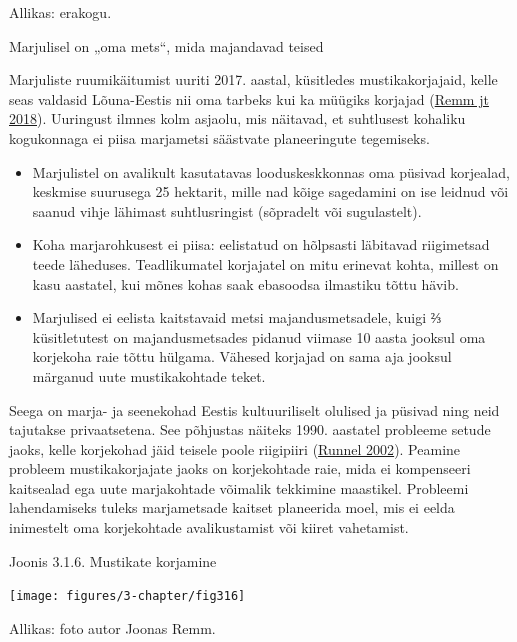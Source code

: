 \documentclass[estonian,]{article}
\providecommand{\tightlist}{%
  \setlength{\itemsep}{0pt}\setlength{\parskip}{0pt}}
\begin{document}
\begin{imgsource}
{Allikas:} erakogu.
\end{imgsource}

Marjulisel on „oma mets``, mida majandavad teised

Marjuliste ruumikäitumist uuriti 2017. aastal, küsitledes mustikakorjajaid, kelle seas valdasid Lõuna-Eestis nii oma tarbeks kui ka müügiks korjajad (\protect\hyperlink{Remm2018}{Remm jt 2018}). Uuringust ilmnes kolm asjaolu, mis näitavad, et suhtlusest kohaliku kogukonnaga ei piisa marjametsi säästvate planeeringute tegemiseks.

\begin{itemize}
\tightlist
\item
  Marjulistel on avalikult kasutatavas looduskeskkonnas oma püsivad korjealad, keskmise suurusega 25 hektarit, mille nad kõige sagedamini on ise leidnud või saanud vihje lähimast suhtlusringist (sõpradelt või sugulastelt).
\item
  Koha marjarohkusest ei piisa: eelistatud on hõlpsasti läbitavad riigimetsad teede läheduses. Teadlikumatel korjajatel on mitu erinevat kohta, millest on kasu aastatel, kui mõnes kohas saak ebasoodsa ilmastiku tõttu hävib.
\item
  Marjulised ei eelista kaitstavaid metsi majandusmetsadele, kuigi ⅔ küsitletutest on majandusmetsades pidanud viimase 10 aasta jooksul oma korjekoha raie tõttu hülgama. Vähesed korjajad on sama aja jooksul märganud uute mustikakohtade teket.
\end{itemize}

Seega on marja- ja seenekohad Eestis kultuuriliselt olulised ja püsivad ning neid tajutakse privaatsetena. See põhjustas näiteks 1990. aastatel probleeme setude jaoks, kelle korjekohad jäid teisele poole riigipiiri (\protect\hyperlink{Runnel2002}{Runnel 2002}). Peamine probleem mustikakorjajate jaoks on korjekohtade raie, mida ei kompenseeri kaitsealad ega uute marjakohtade võimalik tekkimine maastikel. Probleemi lahendamiseks tuleks marjametsade kaitset planeerida moel, mis ei eelda inimestelt oma korjekohtade avalikustamist või kiiret vahetamist.

{Joonis 3.1.6.} Mustikate korjamine

\begin{center}\texttt{[image: figures/3-chapter/fig316]} \end{center}

\begin{imgsource}
{Allikas:} foto autor Joonas Remm.
\end{imgsource}
\end{document}
